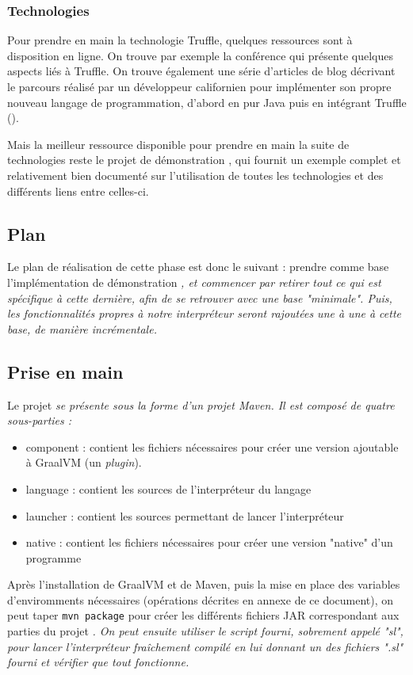 \documentclass[../report.tex]{subfiles}
\begin{document}
\subsubsection{Technologies}
Pour prendre en main la technologie Truffle, quelques ressources sont à disposition en ligne. On trouve par exemple la conférence \cite{OneVM} qui présente quelques aspects liés à Truffle. On trouve également une série d'articles de blog décrivant le parcours réalisé par un développeur californien pour implémenter son propre nouveau langage de programmation, d'abord en pur Java puis en intégrant Truffle (\cite{WritingTruffle}).

Mais la meilleur ressource disponible pour prendre en main la suite de technologies reste le projet de démonstration , qui fournit un exemple complet et relativement bien documenté sur l'utilisation de toutes les technologies et des différents liens entre celles-ci.
\subsection{Plan}
Le plan de réalisation de cette phase est donc le suivant : prendre comme base l'implémentation de démonstration \sl, et commencer par retirer tout ce qui est spécifique à cette dernière, afin de se retrouver avec une base "minimale". Puis, les fonctionnalités propres à notre interpréteur seront rajoutées une à une à cette base, de manière incrémentale.
\subsection{Prise en main}\label{subsec:part1handling}
Le projet \sl{} se présente sous la forme d'un projet \textit{Maven}. Il est composé de quatre sous-parties : 
\begin{itemize}
    \item component : contient les fichiers nécessaires pour créer une version ajoutable à GraalVM (un \textit{plugin}).
    \item language : contient les sources de l'interpréteur du langage \sl{}
    \item launcher : contient les sources permettant de lancer l'interpréteur \sl{}
    \item native : contient les fichiers nécessaires pour créer une version "native" d'un programme \sl{}
\end{itemize}
Après l'installation de GraalVM et de Maven, puis la mise en place des variables d'enviromments nécessaires (opérations décrites en annexe de ce document), on peut taper \texttt{mvn package} pour créer les différents fichiers JAR correspondant aux parties du projet \sl{}. On peut ensuite utiliser le script fourni, sobrement appelé "sl", pour lancer l'interpréteur fraîchement compilé en lui donnant un des fichiers ".sl" fourni et vérifier que tout fonctionne.
\end{document}
